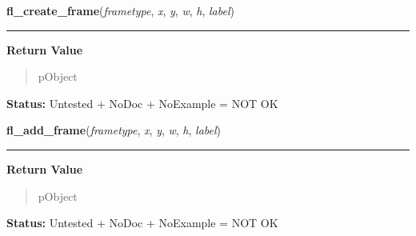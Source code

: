     \label{xformslib:library:fl_create_frame}

    \vspace{0.5ex}

\hspace{.8\funcindent}\begin{boxedminipage}{\funcwidth}

    \raggedright \textbf{fl\_create\_frame}(\textit{frametype}, \textit{x}, \textit{y}, \textit{w}, \textit{h}, \textit{label})

    \vspace{-1.5ex}

    \rule{\textwidth}{0.5\fboxrule}
\setlength{\parskip}{2ex}
\setlength{\parskip}{1ex}
      \textbf{Return Value}
    \vspace{-1ex}

      \begin{quote}
      pObject

      \end{quote}

\textbf{Status:} Untested + NoDoc + NoExample = NOT OK



    \end{boxedminipage}

    \label{xformslib:library:fl_add_frame}

    \vspace{0.5ex}

\hspace{.8\funcindent}\begin{boxedminipage}{\funcwidth}

    \raggedright \textbf{fl\_add\_frame}(\textit{frametype}, \textit{x}, \textit{y}, \textit{w}, \textit{h}, \textit{label})

    \vspace{-1.5ex}

    \rule{\textwidth}{0.5\fboxrule}
\setlength{\parskip}{2ex}
\setlength{\parskip}{1ex}
      \textbf{Return Value}
    \vspace{-1ex}

      \begin{quote}
      pObject

      \end{quote}

\textbf{Status:} Untested + NoDoc + NoExample = NOT OK



    \end{boxedminipage}

